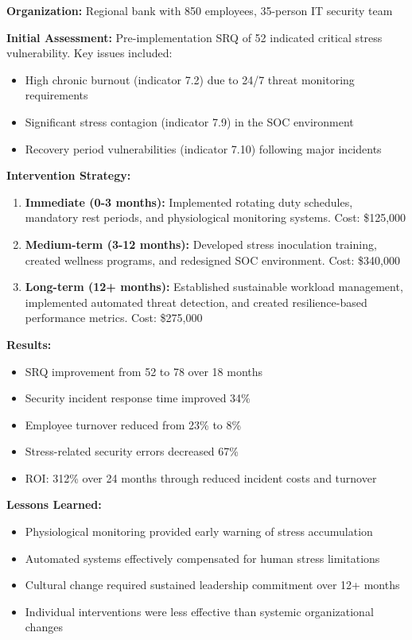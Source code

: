 \documentclass[11pt,a4paper]{article}
\begin{document}
\textbf{Organization:} Regional bank with 850 employees, 35-person IT security team

\textbf{Initial Assessment:} Pre-implementation SRQ of 52 indicated critical stress vulnerability. Key issues included:
\begin{itemize}
\item High chronic burnout (indicator 7.2) due to 24/7 threat monitoring requirements
\item Significant stress contagion (indicator 7.9) in the SOC environment
\item Recovery period vulnerabilities (indicator 7.10) following major incidents
\end{itemize}

\textbf{Intervention Strategy:}
\begin{enumerate}
\item \textbf{Immediate (0-3 months):} Implemented rotating duty schedules, mandatory rest periods, and physiological monitoring systems. Cost: \$125,000
\item \textbf{Medium-term (3-12 months):} Developed stress inoculation training, created wellness programs, and redesigned SOC environment. Cost: \$340,000
\item \textbf{Long-term (12+ months):} Established sustainable workload management, implemented automated threat detection, and created resilience-based performance metrics. Cost: \$275,000
\end{enumerate}

\textbf{Results:}
\begin{itemize}
\item SRQ improvement from 52 to 78 over 18 months
\item Security incident response time improved 34\%
\item Employee turnover reduced from 23\% to 8\%
\item Stress-related security errors decreased 67\%
\item ROI: 312\% over 24 months through reduced incident costs and turnover
\end{itemize}

\textbf{Lessons Learned:}
\begin{itemize}
\item Physiological monitoring provided early warning of stress accumulation
\item Automated systems effectively compensated for human stress limitations
\item Cultural change required sustained leadership commitment over 12+ months
\item Individual interventions were less effective than systemic organizational changes
\end{itemize}
\end{document}
